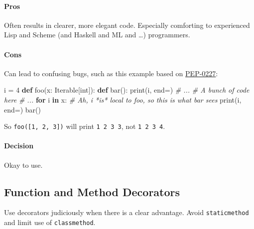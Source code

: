\documentclass[
]{article}
\newenvironment{Shaded}{}{}
\newcommand{\BuiltInTok}[1]{\textcolor[rgb]{0.00,0.50,0.00}{#1}}
\newcommand{\CommentTok}[1]{\textcolor[rgb]{0.38,0.63,0.69}{\textit{#1}}}
\newcommand{\ControlFlowTok}[1]{\textcolor[rgb]{0.00,0.44,0.13}{\textbf{#1}}}
\newcommand{\DecValTok}[1]{\textcolor[rgb]{0.25,0.63,0.44}{#1}}
\newcommand{\KeywordTok}[1]{\textcolor[rgb]{0.00,0.44,0.13}{\textbf{#1}}}
\newcommand{\NormalTok}[1]{#1}
\newcommand{\OperatorTok}[1]{\textcolor[rgb]{0.40,0.40,0.40}{#1}}
\newcommand{\StringTok}[1]{\textcolor[rgb]{0.25,0.44,0.63}{#1}}
\begin{document}
\paragraph{Pros}

Often results in clearer, more elegant code. Especially comforting to
experienced Lisp and Scheme (and Haskell and ML and \ldots) programmers.

\paragraph{Cons}

Can lead to confusing bugs, such as this example based on
\href{https://peps.python.org/pep-0227/}{PEP-0227}:

\begin{samepage}
\begin{Shaded}
\begin{Highlighting}[]
\NormalTok{i }\OperatorTok{=} \DecValTok{4}
\KeywordTok{def}\NormalTok{ foo(x: Iterable[}\BuiltInTok{int}\NormalTok{]):}
    \KeywordTok{def}\NormalTok{ bar():}
        \BuiltInTok{print}\NormalTok{(i, end}\OperatorTok{=}\StringTok{\textquotesingle{}\textquotesingle{}}\NormalTok{)}
    \CommentTok{\# ...}
    \CommentTok{\# A bunch of code here}
    \CommentTok{\# ...}
    \ControlFlowTok{for}\NormalTok{ i }\KeywordTok{in}\NormalTok{ x:  }\CommentTok{\# Ah, i *is* local to foo, so this is what bar sees}
        \BuiltInTok{print}\NormalTok{(i, end}\OperatorTok{=}\StringTok{\textquotesingle{}\textquotesingle{}}\NormalTok{)}
\NormalTok{    bar()}
\end{Highlighting}
\end{Shaded}
\end{samepage}

So \texttt{foo({[}1,\ 2,\ 3{]})} will print \texttt{1\ 2\ 3\ 3}, not
\texttt{1\ 2\ 3\ 4}.

\paragraph{Decision}

Okay to use.

\subsection{Function and Method Decorators}

Use decorators judiciously when there is a clear advantage. Avoid
\texttt{staticmethod} and limit use of \texttt{classmethod}.
\end{document}
